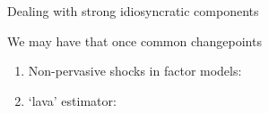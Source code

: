 \documentclass{beamer}
\begin{document}

\begin{frame}{Dealing with strong idiosyncratic components}

We may have that once common changepoints 

\begin{enumerate}
    \item Non-pervasive shocks in factor models: \cite{luciani2014forecasting}
    \item `lava' estimator: \cite{chernozhukov2017lava}
\end{enumerate}

\end{frame}
\end{document}
